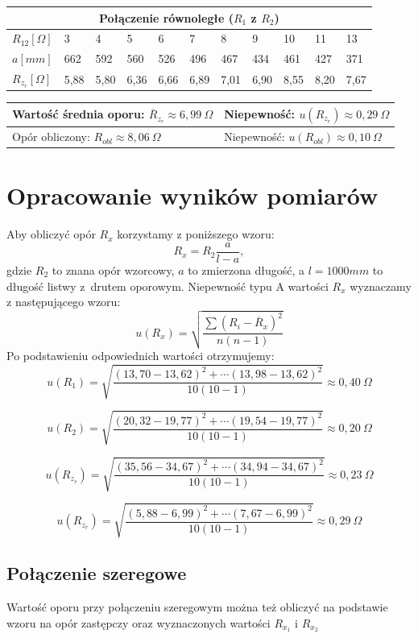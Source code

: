 \documentclass[a4paper,11pt]{article}
\begin{document}
\begin{table}[!ht]
\setlength{\extrarowheight}{5pt}
\centering
\begin{tabularx}{\textwidth}{XXXXXXXXXXX}

\multicolumn{11}{c}{\textbf{Połączenie równoległe ($R_1$ z $R_2$)}}\\        
\hline
$R_{12}[\Omega]$  & 3 &4 &5 &6 &7 &8 &9 &10 &11 &13\\
\hline
$a[mm]$  & 662 & 592 & 560 & 526 & 496 & 467 & 434 & 461 & 427 & 371
  \\
\hline
$R_{z_r}[\Omega]$ & 5,88 &5,80&6,36 &6,66 &6,89	&7,01 &6,90	&8,55 &8,20	&7,67
\\    
\hline   
\end{tabularx}
\begin{tabularx}{\textwidth}{XX}
\centering
Wartość średnia oporu: $\overline{R}_{z_r}\approx6,99~\Omega $ & Niepewność: $u(R_{z_r})\approx 0,29~\Omega$ \\ \hline
\centering
Opór obliczony: $R_{obl} \approx 8,06~\Omega$ & Niepewność: $u(R_{obl})\approx 0,10 ~\Omega$\\
\end{tabularx}
\end{table}


\section{Opracowanie wyników pomiarów}
Aby obliczyć opór $R_x$ korzystamy z poniższego wzoru:
$$
R_x = R_2 \frac{a}{l-a},
$$
gdzie $R_2$ to znana opór wzorcowy, $a$ to zmierzona długość, a $l=1000mm$ to długość  listwy z~drutem oporowym.
Niepewność typu A wartości $R_x$ wyznaczamy z następującego wzoru:
$$
u(R_x) = \sqrt{\frac{\sum \left( R_i - \overline{R}_x \right)^2 }{n(n-1)}}
$$
Po podstawieniu odpowiednich wartości otrzymujemy:
$$
u(R_1) = \sqrt{\frac{(13,70-13,62)^2 + \cdots (13,98-13,62)^2  }{10(10-1)}}\approx 0,40 ~\Omega
$$

$$
u(R_2) = \sqrt{\frac{(20,32-19,77)^2 + \cdots (19,54-19,77)^2  }{10(10-1)}} \approx 0,20 ~\Omega
$$

$$
u(R_{z_s}) = \sqrt{\frac{(35,56-34,67)^2 + \cdots (34,94-34,67)^2  }{10(10-1)}} \approx 0,23 ~\Omega
$$

$$
u(R_{z_r}) = \sqrt{\frac{(5,88-6,99)^2 + \cdots (7,67-6,99)^2  }{10(10-1)}} \approx 0,29 ~\Omega
$$
\subsection{Połączenie szeregowe}
Wartość oporu przy połączeniu szeregowym można też obliczyć na podstawie wzoru na opór zastępczy oraz wyznaczonych wartości $R_{x_1}$ i  $R_{x_2}$
\end{document}
